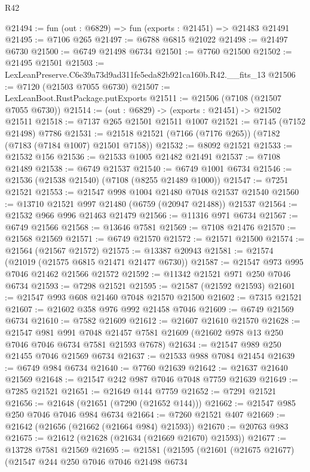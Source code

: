 \begin{lexlean}{R42}
\begin{coremodule}
{@21494 := fun (out : @6829) => fun (exports : @21451) => @21483 @21491
@21495 := @7106 @265
@21497 := @6788 @6815 @21022
@21498 := @21497 @6730
@21500 := @6749 @21498 @6734
@21501 := @7760 @21500
@21502 := @21495 @21501
@21503 := LexLeanPreserve.C6e39a73d9ad311fe5eda82b921ca160b.R42.__fits_13
@21506 := @7120 (@21503 @7055 @6730)
@21507 := LexLeanBoot.RustPackage.putExports
@21511 := @21506 (@7108 (@21507 @7055 @6730))
@21514 := (out : @6829) -> (exports : @21451) -> @21502 @21511
@21518 := @7137 @265 @21501 @21511 @1007
@21521 := @7145 (@7152 @21498) @7786
@21531 := @21518 @21521 (@7166 (@7176 @265)) (@7182 (@7183 (@7184 @1007) @21501 @7158))
@21532 := @8092 @21521
@21533 := @21532 @156
@21536 := @21533 @1005 @21482 @21491
@21537 := @7108 @21489
@21538 := @6749 @21537
@21540 := @6749 @1001 @6734
@21546 := @21536 (@21538 @21540) (@7108 (@8255 @21489 @1000))
@21547 := @7251 @21521
@21553 := @21547 @998 @1004 @21480 @7048 @21537 @21540
@21560 := @13710 @21521 @997 @21480 (@6759 (@20947 @21488)) @21537
@21564 := @21532 @966 @996 @21463 @21479
@21566 := @11316 @971 @6734
@21567 := @6749 @21566
@21568 := @13646 @7581
@21569 := @7108 @21476
@21570 := @21568 @21569
@21571 := @6749 @21570
@21572 := @21571 @21500
@21574 := @21564 (@21567 @21572)
@21575 := @13387 @20943
@21581 := @21574 (@21019 (@21575 @6815 @21471 @21477 @6730))
@21587 := @21547 @973 @995 @7046 @21462 @21566 @21572
@21592 := @11342 @21521 @971 @250 @7046 @6734
@21593 := @7298 @21521
@21595 := @21587 (@21592 @21593)
@21601 := @21547 @993 @608 @21460 @7048 @21570 @21500
@21602 := @7315 @21521
@21607 := @21602 @358 @976 @992 @21458 @7046
@21609 := @6749 @21569 @6734
@21610 := @7582 @21609
@21612 := @21607 @21610 @21570
@21628 := @21547
    @981
    @991
    @7048
    @21457
    @7581
    @21609
    (@21602 @978 @13 @250 @7046 @7046 @6734 @7581 @21593 @7678)
@21634 := @21547 @989 @250 @21455 @7046 @21569 @6734
@21637 := @21533 @988 @7084 @21454
@21639 := @6749 @984 @6734
@21640 := @7760 @21639
@21642 := @21637 @21640 @21569
@21648 := @21547 @242 @987 @7046 @7048 @7759 @21639
@21649 := @7285 @21521
@21651 := @21649 @144 @7759
@21652 := @7291 @21521
@21656 := @21648 (@21651 (@7290 (@21652 @144)))
@21662 := @21547 @985 @250 @7046 @7046 @984 @6734
@21664 := @7260 @21521 @407
@21669 := @21642 (@21656 (@21662 (@21664 @984) @21593))
@21670 := @20763 @983
@21675 := @21612 (@21628 (@21634 (@21669 @21670) @21593))
@21677 := @13728 @7581 @21569
@21695 := @21581
    (@21595
      (@21601
        (@21675 @21677)
        (@21547
          @244
          @250
          @7046
          @7046
          @21498
          @6734
}
\end{coremodule}
\end{lexlean}
